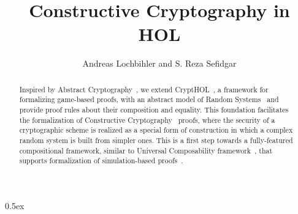 \documentclass[11pt,a4paper]{article}
\begin{document}
\title{Constructive Cryptography in HOL}
\author{Andreas Lochbihler and S. Reza Sefidgar}
\maketitle

\begin{abstract}
  Inspired by Abstract Cryptography~\cite{Maurer2011}, we
  extend CryptHOL~\cite{Basin2017, Lochbihler2017AFP}, a
  framework for formalizing game-based proofs, with an
  abstract model of Random Systems~\cite{Maurer2002} and
  provide proof rules about their composition and equality.
  This foundation facilitates the formalization of
  Constructive Cryptography~\cite{Maurer2011a} proofs, where
  the security of a cryptographic scheme is realized as a
  special form of construction in which a complex random
  system is built from simpler ones.  This is a first step
  towards a fully-featured compositional framework, similar
  to Universal Composability framework~\cite{Canetti2001},
  that supports formalization of simulation-based
  proofs~\cite{Goldwasser1989}. 
\end{abstract}


\tableofcontents

\clearpage

\parindent 0pt\parskip 0.5ex





\end{document}

